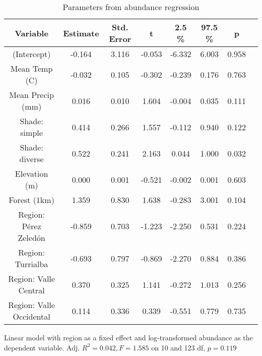 \begin{table}[!h]
\centering
\caption{\label{tab:lm_abundance}Parameters from abundance regression}
\centering
\fontsize{9}{11}\selectfont
\begin{threeparttable}
\begin{tabular}[t]{cccccccc}
\hline\hline
Variable & Estimate & Std. Error & t & 2.5 \% & 97.5 \% & p &  \\
\midrule
(Intercept) & -0.164 & 3.116 & -0.053 & -6.332 & 6.003 & 0.958 & \\
Mean Temp (C) & -0.032 & 0.105 & -0.302 & -0.239 & 0.176 & 0.763 & \\
Mean Precip (mm) & 0.016 & 0.010 & 1.604 & -0.004 & 0.035 & 0.111 & \\
Shade: simple & 0.414 & 0.266 & 1.557 & -0.112 & 0.940 & 0.122 & \\
Shade: diverse & 0.522 & 0.241 & 2.163 & 0.044 & 1.000 & 0.032 & \\
Elevation (m) & 0.000 & 0.001 & -0.521 & -0.002 & 0.001 & 0.603 & \\
Forest (1km) & 1.359 & 0.830 & 1.638 & -0.283 & 3.001 & 0.104 & \\
Region: Pérez Zeledón & -0.859 & 0.703 & -1.223 & -2.250 & 0.531 & 0.224 & \\
Region: Turrialba & -0.693 & 0.797 & -0.869 & -2.270 & 0.884 & 0.386 & \\
Region: Valle Central & 0.370 & 0.325 & 1.141 & -0.272 & 1.013 & 0.256 & \\
Region: Valle Occidental & 0.114 & 0.336 & 0.339 & -0.551 & 0.779 & 0.735 & \\
\hline\hline
\end{tabular}
\begin{tablenotes}[para]
\item Linear model with region as a fixed effect and log-transformed abundance as the dependent variable. Adj. $R^2 = 0.042, F = 1.585$ on 10 and 123 df, $p = 0.119$
\end{tablenotes}
\end{threeparttable}
\end{table}
